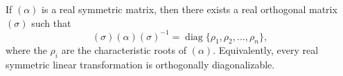 If $(\alpha)$ is a real symmetric matrix, then there exists a real orthogonal matrix $(\sigma)$ such that
$$(\sigma)(\alpha)(\sigma)^{-1} = \operatorname{diag}\{\rho_1, \rho_2, \ldots, \rho_n\},$$
where the $\rho_i$ are the characteristic roots of $(\alpha)$. Equivalently, every real symmetric linear transformation is orthogonally diagonalizable.
